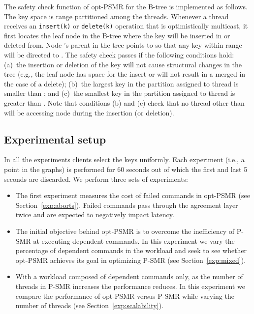 \documentclass[conference]{IEEEtran}
\begin{document}
The safety check function of opt-PSMR for the B-tree is implemented as follows. 
The key space is range partitioned among the threads. 
Whenever a thread  receives an \texttt{insert(k)} or \texttt{delete(k)} operation that is optimistically multicast, it first locates the leaf node  in the B-tree where the key will be inserted in or deleted from. 
Node 's parent in the tree points to  so that any key within range  will be directed to .
The safety check passes if the following conditions hold:
(a)~the insertion or deletion of the key will not cause structural changes in the tree (e.g., the leaf node has space for the insert or will not result in a merged in the case of a delete);
(b)~the largest key in the partition assigned to thread  is smaller than ; and
(c)~the smallest key in the partition assigned to thread  is greater than .
Note that conditions (b) and (c) check that no thread other than  will be accessing node  during the insertion (or deletion).


\subsection{Experimental setup}

In all the experiments clients select the keys uniformly. Each experiment (i.e., a point in the graphs) is performed for 60 seconds out of which the first and last 5 seconds are discarded. We perform three sets of experiments: 



\begin{itemize}

\item The first experiment measures the cost of failed commands in opt-PSMR (see Section~\ref{exp:aborts}). Failed commands pass through the agreement layer twice and are expected to negatively impact  latency. 

\item The initial objective behind opt-PSMR is to overcome the inefficiency of P-SMR at executing dependent commands. In this experiment we vary the percentage of dependent commands in the workload and seek to see whether opt-PSMR achieves its goal in optimizing P-SMR (see Section~\ref{exp:mixed}). 

\item With a workload composed of dependent commands only, as the number of threads in P-SMR increases the performance reduces. In this experiment we compare the performance of opt-PSMR versus P-SMR while varying the number of threads (see Section~\ref{exp:scalability}). 

\end{itemize}
\end{document}
